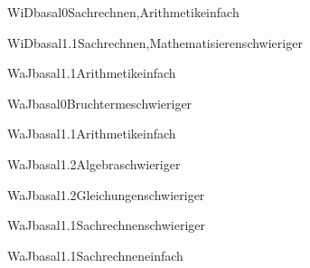 \documentclass[12pt]{article}
\begin{document}
\begin{Add}{WiD}{basal0}{Sachrechnen,Arithmetik}{einfach}
\end{Add}

\begin{Add}{WiD}{basal1.1}{Sachrechnen,Mathematisieren}{schwieriger}
\end{Add}


\begin{Add}{WaJ}{basal1.1}{Arithmetik}{einfach}
\end{Add}

\begin{Add}{WaJ}{basal0}{Bruchterme}{schwieriger}
\end{Add}

\begin{Add}{WaJ}{basal1.1}{Arithmetik}{einfach}
\end{Add}

\begin{Add}{WaJ}{basal1.2}{Algebra}{schwieriger}
\end{Add}

\begin{Add}{WaJ}{basal1.2}{Gleichungen}{schwieriger}
\end{Add}

\begin{Add}{WaJ}{basal1.1}{Sachrechnen}{schwieriger}
\end{Add}

\begin{Add}{WaJ}{basal1.1}{Sachrechnen}{einfach}
\end{Add}
\end{document}
